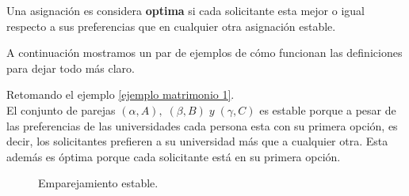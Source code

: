\begin{dfn}{\cite{GaleShapley}}
\label{optima}
Una asignación es considera \textbf{optima} si cada solicitante esta mejor o igual respecto a sus preferencias que en cualquier otra asignación estable. 
\end{dfn}

A continuación mostramos un par de ejemplos de cómo funcionan las definiciones para dejar todo más claro. 

\begin{eje}
Retomando el ejemplo \ref{ejemplo matrimonio 1}. \\
El conjunto de parejas $(\alpha, A), \; (\beta, B)\; y\; (\gamma, C)$ es estable porque a pesar de las preferencias de las universidades cada persona esta con su primera opción, es decir, los solicitantes prefieren a su universidad más que a cualquier otra. Esta además es óptima porque cada solicitante está en su primera opción.
\begin{figure}[H]\centering


\caption{Emparejamiento estable.}
\end{figure}

\fin
\end{eje}
